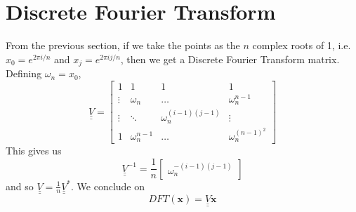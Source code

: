 \documentclass[12pt, openany]{report}
\theoremstyle{definition}
\def\mat#1{\underline{\underline{#1}}}
\begin{document}
\section{Discrete Fourier Transform}
From the previous section, if we take the points as the $n$ complex roots of 1, i.e. $x_0 = e^{2\pi i/n}$ and $x_j = e^{2\pi ij/n}$, then we get a Discrete Fourier Transform matrix. Defining $\omega_n = x_0$,
\begin{equation}
	\mat{V} = \begin{bmatrix}
			1 & 1 & 1 & 1 \\
			\vdots & \omega_n & \dots & \omega_n^{n-1}\\
			\vdots & \ddots & \omega_n^{(i-1)(j-1)} & \vdots \\
			1 & \omega_n ^{n-1} & \dots & \omega_n^{(n-1)^2}
		\end{bmatrix}
\end{equation}
This gives us 
\begin{equation}
	\mat{V}^{-1} = \frac{1}{n} \begin{bmatrix}
		\omega_n^{-(i-1)(j-1)}
	\end{bmatrix}
\end{equation}
and so $\mat{V} = \frac{1}{n}\mat{V}^*$. We conclude on 
\begin{equation}
	DFT(\textbf{x}) = \mat{V}\textbf{x}
\end{equation}
\end{document}
